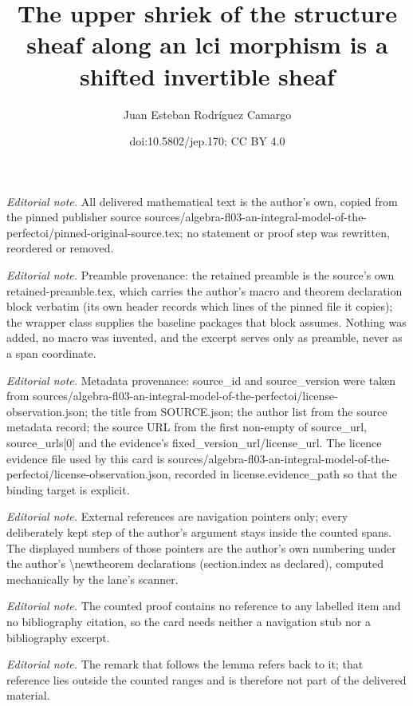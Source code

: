 \documentclass[10pt,a4paper]{amsart}
\title{The upper shriek of the structure sheaf along an lci morphism is a shifted invertible sheaf}
\author{Juan Esteban Rodríguez Camargo}
\date{doi:10.5802/jep.170; CC BY 4.0}
\numberwithin{equation}{section}
\theoremstyle{definition}
\begin{document}
\maketitle
\noindent\textit{Editorial note.} All delivered mathematical text is the author's own, copied from the pinned publisher source sources/algebra-fl03-an-integral-model-of-the-perfectoi/pinned-original-source.tex; no statement or proof step was rewritten, reordered or removed.\par\medskip
\noindent\textit{Editorial note.} Preamble provenance: the retained preamble is the source's own retained-preamble.tex, which carries the author's macro and theorem declaration block verbatim (its own header records which lines of the pinned file it copies); the wrapper class supplies the baseline packages that block assumes. Nothing was added, no macro was invented, and the excerpt serves only as preamble, never as a span coordinate.\par\medskip
\noindent\textit{Editorial note.} Metadata provenance: source\_id and source\_version were taken from sources/algebra-fl03-an-integral-model-of-the-perfectoi/license-observation.json; the title from SOURCE.json; the author list from the source metadata record; the source URL from the first non-empty of source\_url, source\_urls[0] and the evidence's fixed\_version\_url/license\_url. The licence evidence file used by this card is sources/algebra-fl03-an-integral-model-of-the-perfectoi/license-observation.json, recorded in license.evidence\_path so that the binding target is explicit.\par\medskip
\noindent\textit{Editorial note.} External references are navigation pointers only; every deliberately kept step of the author's argument stays inside the counted spans. The displayed numbers of those pointers are the author's own numbering under the author's \textbackslash{}newtheorem declarations (section.index as declared), computed mechanically by the lane's scanner.\par\medskip
\noindent\textit{Editorial note.} The counted proof contains no reference to any labelled item and no bibliography citation, so the card needs neither a navigation stub nor a bibliography excerpt.\par\medskip
\noindent\textit{Editorial note.} The remark that follows the lemma refers back to it; that reference lies outside the counted ranges and is therefore not part of the delivered material.\par\medskip
\end{document}
